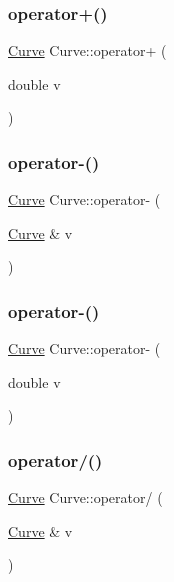 \subsubsection{\texorpdfstring{operator+()}{operator+()}\hspace{0.1cm}{\footnotesize\ttfamily [2/2]}}
{\footnotesize\ttfamily \hyperlink{class_curve}{Curve} Curve\+::operator+ (\begin{DoxyParamCaption}\item[{double}]{v }\end{DoxyParamCaption})}

\mbox{\label{class_curve_a55facce84fd4b5bd58124772735c9248}} 
\subsubsection{\texorpdfstring{operator-\/()}{operator-()}\hspace{0.1cm}{\footnotesize\ttfamily [1/2]}}
{\footnotesize\ttfamily \hyperlink{class_curve}{Curve} Curve\+::operator-\/ (\begin{DoxyParamCaption}\item[{\hyperlink{class_curve}{Curve} \&}]{v }\end{DoxyParamCaption})}

\mbox{\label{class_curve_a1f487e5943b841112dd72c077dee56f6}} 
\subsubsection{\texorpdfstring{operator-\/()}{operator-()}\hspace{0.1cm}{\footnotesize\ttfamily [2/2]}}
{\footnotesize\ttfamily \hyperlink{class_curve}{Curve} Curve\+::operator-\/ (\begin{DoxyParamCaption}\item[{double}]{v }\end{DoxyParamCaption})}

\mbox{\label{class_curve_abec3bbbc40b1c643ccb31299dfd53a4d}} 
\subsubsection{\texorpdfstring{operator/()}{operator/()}\hspace{0.1cm}{\footnotesize\ttfamily [1/2]}}
{\footnotesize\ttfamily \hyperlink{class_curve}{Curve} Curve\+::operator/ (\begin{DoxyParamCaption}\item[{\hyperlink{class_curve}{Curve} \&}]{v }\end{DoxyParamCaption})}

